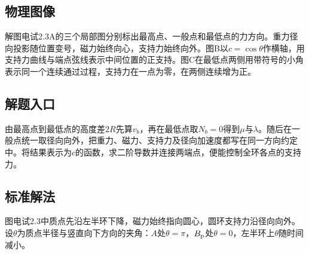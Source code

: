 \documentclass[UTF8,fontset=fandol,a4paper,11pt]{ctexart}
\begin{document}

\subsection*{物理图像}

解图电试2.3A的三个局部图分别标出最高点、一般点和最低点的力方向。重力径向投影随位置变号，磁力始终向心，支持力始终向外。图B以$c=\cos\theta$作横轴，用支持力曲线与端点弦线表示中间位置的正支持。图C在最低点两侧用带符号的小角表示同一个连续通过过程，支持力在一点为零，在两侧连续增为正。



\subsection*{解题入口}

由最高点到最低点的高度差$2R$先算$v_b$，再在最低点取$N_b=0$得到$\mu$与$\lambda$。随后在一般点统一取径向向外，把重力、磁力、支持力及径向加速度都写在同一方向约定中。将结果表示为$c$的函数，求二阶导数并连接两端点，便能控制全环各点的支持力。



\subsection*{标准解法}


图电试2.3中质点先沿左半环下降，磁力始终指向圆心，圆环支持力沿径向向外。设$\theta$为质点半径与竖直向下方向的夹角：$A$处$\theta=\pi$，$B_{\rm p}$处$\theta=0$，左半环上$\theta$随时间减小。
\end{document}
